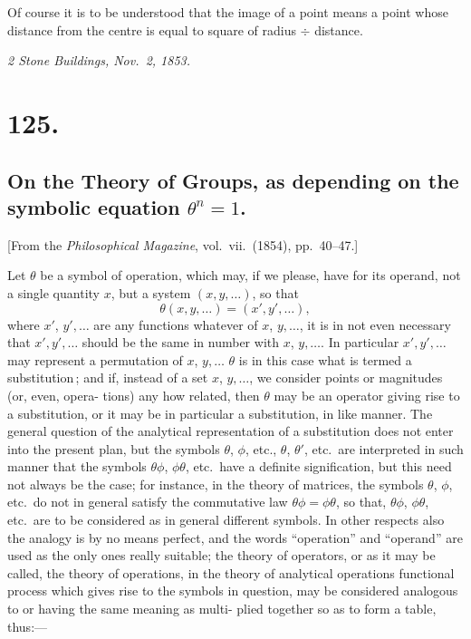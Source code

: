 \documentclass[11pt,a4paper]{book}
\begin{document}
\smallskip

Of course it is to be understood that the image of a point means a point whose
distance from the centre is equal to square of radius $\div$ distance.

\medskip
\noindent\textit{2 Stone Buildings, Nov.\ 2, 1853.}

\section*{125.}
\subsection*{On the Theory of Groups, as depending on the symbolic equation $\theta^n=1$.}

[From the \textit{Philosophical Magazine}, vol.\ vii.\ (1854), pp.\ 40--47.]

\medskip

Let $\theta$ be a symbol of operation, which may, if we please, have for its operand,
not a single quantity $x$, but a system $(x, y,\ldots)$, so that
\[
\theta(x, y,\ldots) = (x', y',\ldots),
\]
where $x'$, $y',\ldots$ are any functions whatever of $x$, $y,\ldots$, it is in not even necessary that
$x', y',\ldots$ should be the same in number with $x$, $y,\ldots$. In particular $x', y',\ldots$ may
represent a permutation of $x$, $y,\ldots$ $\theta$ is in this case what is termed a substitution\,;
and if, instead of a set $x$, $y,\ldots$, we consider points or magnitudes (or, even, opera-
tions) any how related, then $\theta$ may be an operator giving rise to a substitution, or it
may be in particular a substitution, in like manner. The general question of the
analytical representation of a substitution does not enter into the present plan, but
the symbols $\theta$, $\phi$, etc., $\theta$, $\theta'$, etc.\ are interpreted in such manner that the symbols
$\theta\phi$, $\phi\theta$, etc.\ have a definite signification, but this need not always be the case; for
instance, in the theory of matrices, the symbols $\theta$, $\phi$, etc.\ do not in general satisfy
the commutative law $\theta\phi=\phi\theta$, so that, $\theta\phi$, $\phi\theta$, etc.\ are to be considered as in general
different symbols. In other respects also the analogy is by no means perfect, and
the words ``operation'' and ``operand'' are used as the only ones really suitable; the
theory of operators, or as it may be called, the theory of operations, in the
theory of analytical operations functional process which gives rise to the symbols
in question, may be considered analogous to or having the same meaning as multi-
plied together so as to form a table, thus:---
\end{document}
